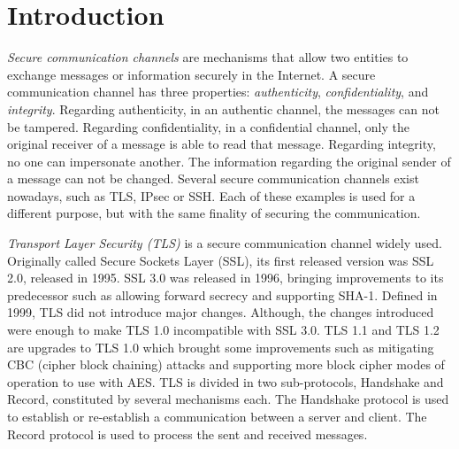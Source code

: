 \documentclass{sig-alternate-05-2015}
\begin{document}

%
%

%
%
\printccsdesc


\section{Introduction}

\textit{Secure communication channels} are mechanisms that allow two entities to exchange messages or information securely in the Internet.
A secure communication channel has three properties: \textit{authenticity}, \textit{confidentiality}, and \textit{integrity}. Regarding authenticity, in an authentic channel, the messages can not be tampered. Regarding confidentiality, in a confidential channel, only the original receiver of a message is able to read that message. Regarding integrity, no one can impersonate another. The information regarding the original sender of a message can not be changed.
Several secure communication channels exist nowadays, such as TLS, IPsec or SSH. Each of these examples is used for a different purpose, but with the same finality of securing the communication.

\textit{Transport Layer Security (TLS)} is a secure communication channel widely used. Originally called Secure Sockets Layer (SSL), its first released version was SSL 2.0, released in 1995. SSL 3.0 was released in 1996, bringing improvements to its predecessor such as allowing forward secrecy and supporting SHA-1.
Defined in 1999, TLS did not introduce major changes. Although, the changes introduced were enough to make TLS 1.0 incompatible with SSL 3.0.
TLS 1.1 and TLS 1.2 are upgrades to TLS 1.0 which brought some improvements such as mitigating CBC (cipher block chaining) attacks and supporting more block cipher modes of operation to use with AES.
TLS is divided in two sub-protocols, Handshake and Record, constituted by several mechanisms each.
The Handshake protocol is used to establish or re-establish a communication between a server and client. The Record protocol is used to process the sent and received messages.
\end{document}
